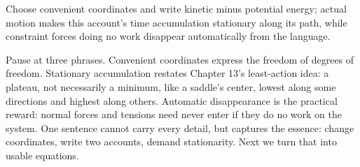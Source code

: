 
\begin{oneline}
Choose convenient coordinates and write kinetic minus potential energy; actual motion makes this account's time accumulation stationary along its path, while constraint forces doing no work disappear automatically from the language.
\end{oneline}

\begin{mainline}
Pause at three phrases. Convenient coordinates express the freedom of degrees of freedom. Stationary accumulation restates Chapter 13's least-action idea: a plateau, not necessarily a minimum, like a saddle's center, lowest along some directions and highest along others. Automatic disappearance is the practical reward: normal forces and tensions need never enter if they do no work on the system. One sentence cannot carry every detail, but captures the essence: change coordinates, write two accounts, demand stationarity. Next we turn that into usable equations.
\end{mainline}


